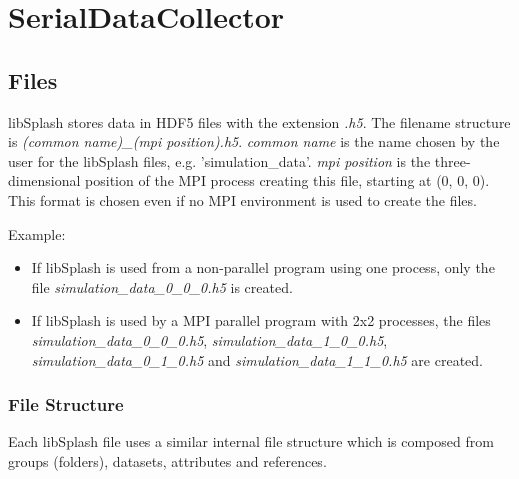 \documentclass[a4paper,10pt,BCOR12mm]{report}
\begin{document}
\chapter{SerialDataCollector}

\section{Files}

libSplash stores data in HDF5 files with the extension \emph{.h5}.
The filename structure is \emph{(common name)\_(mpi position).h5}.
\emph{common name} is the name chosen by the user for the libSplash files, e.g.
'simulation\_data'.
\emph{mpi position} is the three-dimensional position of the MPI process creating this
file, starting at (0, 0, 0).
This format is chosen even if no MPI environment is used to create the files.

Example:
\begin{itemize}
	\item If libSplash is used from a non-parallel program using one process, only the file \emph{simulation\_data\_0\_0\_0.h5} is created.

	\item If libSplash is used by a MPI parallel program with 2x2 processes, the files
	\emph{simulation\_data\_0\_0\_0.h5}, \emph{simulation\_data\_1\_0\_0.h5},
	\emph{simulation\_data\_0\_1\_0.h5} and \emph{simulation\_data\_1\_1\_0.h5} are created.
\end{itemize}

\subsection{File Structure}

Each libSplash file uses a similar internal file structure which is composed from groups (folders),
datasets, attributes and references.
\end{document}
